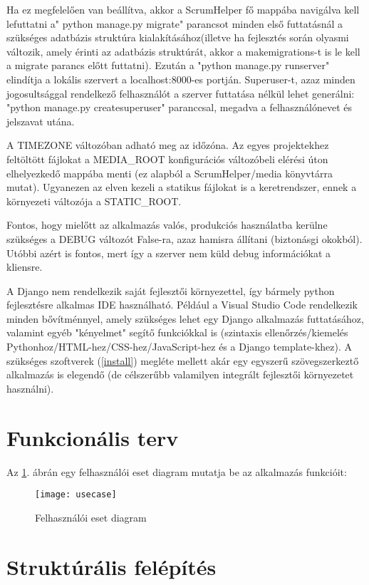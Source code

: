 Ha ez megfelelően van beállítva, akkor a ScrumHelper fő mappába navigálva kell lefuttatni a" python manage.py migrate" parancsot minden első futtatásnál a szükséges adatbázis struktúra kialakításához(illetve ha fejlesztés során olyasmi változik, amely érinti az adatbázis struktúrát, akkor a makemigrations-t is le kell a migrate parancs előtt futtatni). Ezután a "python manage.py runserver" elindítja a lokális szervert a localhost:8000-es portján. Superuser-t, azaz minden jogosultsággal rendelkező felhasználót a szerver futtatása nélkül lehet generálni: "python manage.py createsuperuser" paranccsal, megadva a felhasználónevet és jelszavat utána.

A TIMEZONE változóban adható meg az időzóna. Az egyes projektekhez feltöltött fájlokat a MEDIA\_ROOT konfigurációs változóbeli elérési úton elhelyezkedő mappába menti (ez alapból a ScrumHelper/media könyvtárra mutat). Ugyanezen az elven kezeli a statikus fájlokat is a keretrendszer, ennek a környezeti változója a STATIC\_ROOT.

Fontos, hogy mielőtt az alkalmazás valós, produkciós használatba kerülne szükséges a DEBUG változót False-ra, azaz hamisra állítani (biztonásgi okokból). Utóbbi azért is fontos, mert így a szerver nem küld debug információkat a kliensre.

A Django nem rendelkezik saját fejlesztői környezettel, így bármely python fejlesztésre alkalmas IDE használható. Például a Visual Studio Code rendelkezik minden bővítménnyel, amely szükséges lehet egy Django alkalmazás futtatásához, valamint egyéb "kényelmet" segítő funkciókkal is (szintaxis ellenőrzés/kiemelés Pythonhoz/HTML-hez/CSS-hez/JavaScript-hez és a Django template-khez). A szükséges szoftverek (\ref{install}) megléte mellett akár egy egyszerű szövegszerkeztő alkalmazás is elegendő (de célszerűbb valamilyen integrált fejlesztői környezetet használni).

\section{Funkcionális terv}

Az \ref{fig:usecase}. ábrán egy felhasználói eset diagram mutatja be az alkalmazás funkcióit:

\begin{figure}[H]
	\centering
	\texttt{[image: usecase]}
	\caption{Felhasználói eset diagram}
	\label{fig:usecase}
\end{figure}

\section{Struktúrális felépítés}

